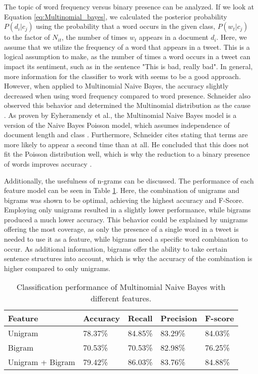 The topic of word frequency versus binary presence can be analyzed. If we look at Equation \eqref{eq:Multinomial_bayes}, we calculated the posterior probability $P(d_i|c_j)$ using the probability that a word occurs in the given class, $P(w_t|c_j)$ to the factor of $N_{it}$, the number of times $w_t$ appears in a document $d_i$. Here, we assume that we utilize the frequency of a word that appears in a tweet. This is a logical assumption to make, as the number of times a word occurs in a tweet can impact its sentiment, such as in the sentence "This is bad, really bad". In general, more information for the classifier to work with seems to be a good approach. However, when applied to Multinomial Naive Bayes, the accuracy slightly decreased when using word frequency compared to word presence. Schneider also observed this behavior and determined the Multinomial distribution as the cause \cite{nb_freq}. As proven by Eyheramendy et al., the Multinomial Naive Bayes model is a version of the Naive Bayes Poisson model, which assumes independence of document length and class \cite{Poisson}. Furthermore, Schneider cites \cite{Poisson_words} stating that terms are more likely to appear a second time than at all. He concluded that this does not fit the Poisson distribution well, which is why the reduction to a binary presence of words improves accuracy \cite{nb_freq}.

Additionally, the usefulness of n-grams can be discussed. The performance of each feature model can be seen in Table \ref{tab:eval_features}. Here, the combination of unigrams and bigrams was shown to be optimal, achieving the highest accuracy and F-Score. Employing only unigrams resulted in a slightly lower performance, while bigrams produced a much lower accuracy. This behavior could be explained by unigrams offering the most coverage, as only the presence of a single word in a tweet is needed to use it as a feature, while bigrams need a specific word combination to occur. As additional information, bigrams offer the ability to take certain sentence structures into account, which is why the accuracy of the combination is higher compared to only unigrams.

\begin{table}
\centering
\caption{Classification performance of Multinomial Naive Bayes with different features.}
\begin{tabular}{ |p{4cm}||p{2cm}|p{2cm}|p{2cm}|p{2cm}| }
 \hline
 Feature &     Accuracy &      Recall &     Precision& F-score \\
 \hline
 Unigram & 78.37\% & 84.85\% & 83.29\% & 84.03\% \\
  \hline
 Bigram & 70.53\% & 70.53\% & 82.98\% & 76.25\% \\
 \hline
 Unigram + Bigram  & 79.42\%&        86.03\%&       83.76\%& 84.88\%\\
 \hline
\end{tabular}
\label{tab:eval_features}
\end{table}


